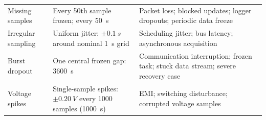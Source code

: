 \documentclass[review,nopreprintline]{elsarticle}
\begin{document}
\begin{longtable}{@{}p{1.55cm}p{3.65cm}p{5.75cm}@{}}
    \addlinespace[2pt]
    Missing samples & Every 50th sample frozen; every \SI{50}{s} & Packet loss; blocked updates; logger dropouts; periodic data freeze \cite{naseriReliableWirelessBMS2025,liuAssessingImpactSampling2025} \\
    \addlinespace[2pt]
    Irregular sampling & Uniform jitter: $\pm\SI{0.1}{s}$ around nominal \SI{1}{s} grid & Scheduling jitter; bus latency; asynchronous acquisition \cite{bergerBenchmarkingBatteryManagement2024,naseriReliableWirelessBMS2025,liuAssessingImpactSampling2025} \\
    \addlinespace[2pt]
    Burst dropout & One central frozen gap: \SI{3600}{s} & Communication interruption; frozen task; stuck data stream; severe recovery case \cite{bergerBenchmarkingBatteryManagement2024,naseriReliableWirelessBMS2025} \\
    \addlinespace[2pt]
    Voltage spikes & Single-sample spikes: $\pm\SI{0.20}{V}$ every 1000 samples (\SI{1000}{s}) & EMI; switching disturbance; corrupted voltage samples \cite{aielloElectromagneticSusceptibilityBattery2020} \\
\end{longtable}
\endgroup
\end{document}
